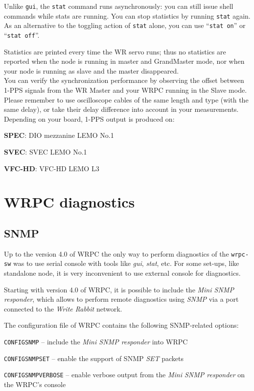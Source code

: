 \documentclass[a4paper, 12pt]{article}
\renewcommand{\_}{\underscore\allowbreak}
\begin{document}
\vspace{1em}
Unlike \texttt{gui}, the \texttt{stat} command runs asynchronously: you can still
issue shell commands while stats are running. You can stop statistics by running
\texttt{stat} again. As an alternative to the toggling action of \texttt{stat}
alone, you can use ``\texttt{stat on}'' or ``\texttt{stat off}''.

Statistics are printed every time the WR servo runs; thus no statistics
are reported when the node is running in master and GrandMaster mode, nor when your node
is running as slave and the master disappeared.\\

You can verify the synchronization performance by observing the offset between
1-PPS signals from the WR Master and your WRPC running in the Slave mode. Please
remember to use oscilloscope cables of the same length and type (with the same
delay), or take their delay difference into account in your measurements.
Depending on your board, 1-PPS output is produced on:
\begin{itemize*}
  \item \textbf{SPEC}: DIO mezzanine LEMO No.1
  \item \textbf{SVEC}: SVEC LEMO No.1
  \item \textbf{VFC-HD}: VFC-HD LEMO L3
\end{itemize*}

\newpage
\section{WRPC diagnostics}
\subsection{SNMP}
\label{Diagnostics via SNMP}

Up to the version 4.0 of WRPC the only way to perform diagnostics
of the \texttt{wrpc-sw} was to use serial console with tools like \textit{gui}, \textit{stat},
etc. For some set-ups, like standalone node, it is very inconvenient to use
external console for diagnostics.

Starting with version 4.0 of WRPC, it is possible to include the \textit{Mini
SNMP responder}, which allows to perform remote diagnostics using \textit{SNMP} via
a port connected to the \textit{Write Rabbit} network.

The configuration file of WRPC contains the following
SNMP-related options:
\begin{itemize*}
\item \texttt{CONFIG\_SNMP} -- include the \textit{Mini SNMP responder} into WRPC
\item \texttt{CONFIG\_SNMP\_SET} -- enable the support of SNMP \textit{SET} packets
\item \texttt{CONFIG\_SNMP\_VERBOSE} -- enable verbose output from the \textit{Mini SNMP
      responder} on the WRPC's console
\end{itemize*}
\end{document}
